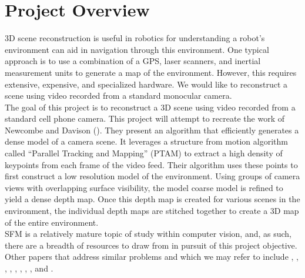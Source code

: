 \section{Project Overview}

3D scene reconstruction is useful in robotics for understanding a robot's environment can aid in navigation through this environment. One typical approach is to use a combination of a GPS, laser scanners, and inertial measurement units to generate a map of the environment. However, this requires extensive, expensive, and specialized hardware. We would like to reconstruct a scene using video recorded from a standard monocular camera. \\

The goal of this project is to reconstruct a 3D scene using video recorded from a standard cell phone camera. This project will attempt to recreate the work of Newcombe and Davison (\citep{newcombe2010live}). They present an algorithm that efficiently generates a dense model of a camera scene. It leverages a structure from motion algorithm called ``Parallel Tracking and Mapping'' (PTAM) to extract a high density of keypoints from each frame of the video feed. Their algorithm uses these points to first construct a low resolution model of the environment. Using groups of camera views with overlapping surface visibility, the model coarse model is refined to yield a dense depth map. Once this depth map is created for various scenes in the environment, the individual depth maps are stitched together to create a 3D map of the entire environment. \\

SFM is a relatively mature topic of study within computer vision, and, as such, there are a breadth of resources to draw from in pursuit of this project objective. Other papers that address similar problems and which we may refer to include \citep{newcombe2010live}, \citep{davison2003real}, \citep{klein2007parallel}, \citep{pollefeys2008detailed}, \citep{kuhl2006monocular}, \citep{magree2014monocular}, \citep{geiger2011stereoscan}, \citep{mclauchlan2000batch}, and \citep{davison2007monoslam}.
